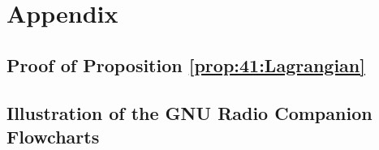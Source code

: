 
\newpage
\section{Appendix}
\label{sec:4:appendix}

\subsection{Proof of Proposition \ref{prop:41:Lagrangian}}
\label{sec:4:proofLagrangian}





\newpage
\subsection{Illustration of the GNU Radio Companion Flowcharts}
\label{sec:4:IllustrationFlowcharts}


